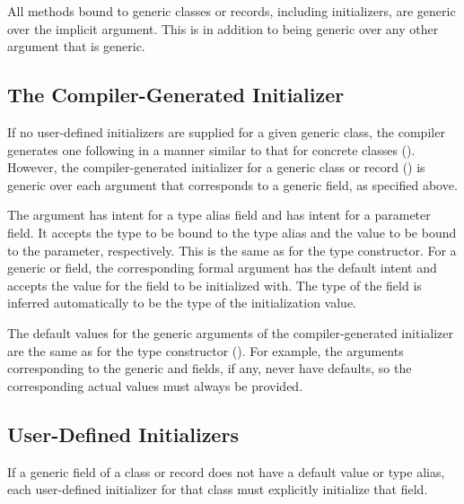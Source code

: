 All methods bound to generic classes or records, including
initializers, are generic over the implicit  argument.
This is in addition to being generic over any other argument that is generic.

\subsection{The Compiler-Generated Initializer}
\label{Generic_Compiler_Generated_Initializers}

If no user-defined initializers are supplied for a given generic class, the
compiler generates one following in a manner similar to that for concrete
classes ().
However, the compiler-generated initializer for a generic class or record
() is generic over each argument that
corresponds to a generic field, as specified above.

The argument has intent  for a type alias field and has intent
 for a parameter field. It accepts the type to be bound
to the type alias and the value to be bound to the parameter, respectively.
This is the same as for the type constructor.
For a generic  or  field, the corresponding
formal argument has the default intent and accepts the value
for the field to be initialized with. The type of the field
is inferred automatically to be the type of the initialization value.

The default values for the generic arguments of the compiler-generated initializer
are the same as for the type constructor ().
For example, the arguments corresponding to the generic 
and  fields, if any, never have defaults, so the corresponding
actual values must always be provided.

\subsection{User-Defined Initializers}
\label{Generic_User_Initializers}

If a generic field of a class or record does not have a default value or type
alias, each user-defined initializer for that class must explicitly initialize
that field.

